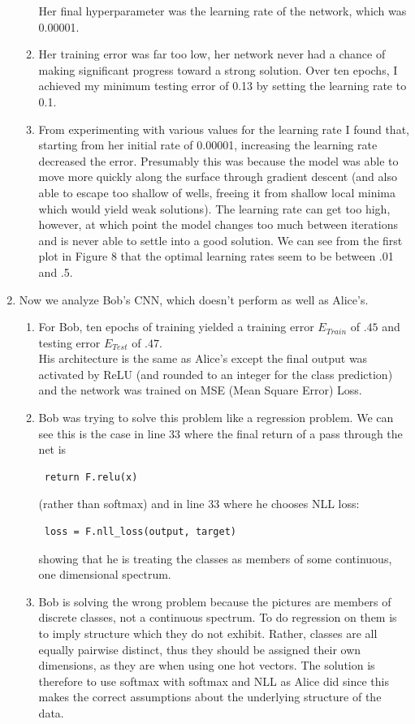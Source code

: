 \documentclass[1pt]{article}
\begin{document}
\begin{enumerate}[label=\arabic*.]
\begin{enumerate}[label=(\alph*)]
Her final hyperparameter was the learning rate of the network, which was 0.00001. 
\item Her training error was far too low, her network never had a chance of making significant progress toward a strong solution. Over ten epochs, I achieved my minimum testing error of 0.13 by setting the learning rate to 0.1.
\item From experimenting with various values for the learning rate I found that, starting from her initial rate of 0.00001, increasing the learning rate decreased the error. Presumably this was because the model was able to move more quickly along the surface through gradient descent (and also able to escape too shallow of wells, freeing it from shallow local minima which would yield weak solutions). The learning rate can get too high, however, at which point the model changes too much between iterations and is never able to settle into a good solution. We can see from the first plot in Figure 8 that the optimal learning rates seem to be between .01 and .5. 
\end{enumerate}
\item Now we analyze Bob's CNN, which doesn't perform as well as Alice's. 
\begin{enumerate}
    \item For Bob, ten epochs of training yielded a training error $E_{Train}$ of $.45$ and testing error $E_{Test}$ of $.47$.\\
    His architecture is the same as Alice's except the final output was activated by ReLU (and rounded to an integer for the class prediction) and the network was trained on MSE (Mean Square Error) Loss.
    \item Bob was trying to solve this problem like a regression problem. We can see this is the case in line 33 where the final return of a pass through the net is \begin{verbatim} return F.relu(x) \end{verbatim} (rather than softmax) and in line 33 where he chooses NLL loss: \begin{verbatim} loss = F.nll_loss(output, target) \end{verbatim}
    showing that he is treating the classes as members of some continuous, one dimensional spectrum.
    \item Bob is solving the wrong problem because the pictures are members of discrete classes, not a continuous spectrum. To do regression on them is to imply structure which they do not exhibit. Rather, classes are all equally pairwise distinct, thus they should be assigned their own dimensions, as they are when using one hot vectors. The solution is therefore to use softmax with softmax and NLL as Alice did since this makes the correct assumptions about the underlying structure of the data. 

\end{enumerate}
\end{enumerate}
\end{document}
